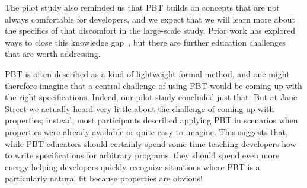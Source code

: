 

The pilot study also reminded us that PBT builds on concepts that are not
always comfortable for developers, and we expect that we will learn more about
the specifics of that discomfort in the large-scale study.  Prior work has
explored ways to close this knowledge
gap~\cite{wrenn2021using,nelson2021automated}, but there are further
education challenges that are worth addressing.


%
%
PBT is often described as a kind of lightweight formal method, and one
might therefore imagine that a central challenge of using PBT would be
coming up with the
right specifications. Indeed, our pilot study concluded just that. But at
Jane Street we actually heard very little about the challenge of coming up with
properties; instead, most participants described applying PBT in scenarios when
properties were already available or quite easy to imagine. This suggests that,
while PBT educators should certainly spend some time teaching developers how to
write specifications for arbitrary programs, they should spend even more energy
helping developers quickly recognize situations where PBT is a particularly
natural fit because properties are obvious!

